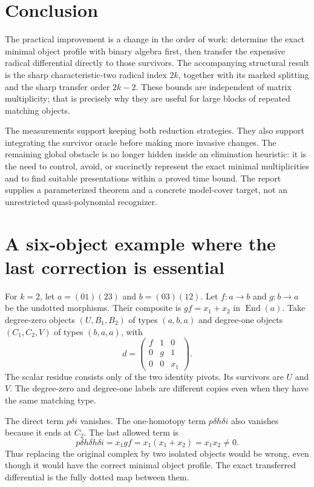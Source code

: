 \documentclass[11pt,letterpaper]{article}
\theoremstyle{definition}
\theoremstyle{remark}
\newcommand{\End}{\operatorname{End}}
\begin{document}
\section{Conclusion}
The practical improvement is a change in the order of work: determine the exact
minimal object profile with binary algebra first, then transfer the expensive
radical differential directly to those survivors. The accompanying structural
result is the sharp characteristic-two radical index $2k$, together with its
marked splitting and the sharp transfer order $2k-2$. These bounds are
independent of matrix multiplicity; that is precisely why they are useful for
large blocks of repeated matching objects.

The measurements support keeping both reduction strategies. They also support
integrating the survivor oracle before making more invasive changes. The
remaining global obstacle is no longer hidden inside an elimination heuristic:
it is the need to control, avoid, or succinctly represent the exact minimal
multiplicities and to find suitable presentations within a proved time bound.
The report supplies a parameterized theorem and a concrete model-cover target,
not an unrestricted quasi-polynomial recognizer.

\appendix
\section{A six-object example where the last correction is essential}
For $k=2$, let $a=(01)(23)$ and $b=(03)(12)$. Let
$f:a\to b$ and $g:b\to a$ be the undotted morphisms. Their composite is
$gf=x_1+x_2$ in $\End(a)$. Take degree-zero objects $(U,B_1,B_2)$ of types
$(a,b,a)$ and degree-one objects $(C_1,C_2,V)$ of types $(b,a,a)$, with
\[
 d=\begin{pmatrix}
 f&1&0\\
 0&g&1\\
 0&0&x_1
 \end{pmatrix}.
\]
The scalar residue consists only of the two identity pivots. Its survivors are
$U$ and $V$. The degree-zero and degree-one labels are different copies even
when they have the same matching type.

The direct term $p\delta i$ vanishes. The one-homotopy term
$p\delta h\delta i$ also vanishes because it ends at $C_2$. The last allowed
term is
\[
 p\delta h\delta h\delta i=x_1gf=x_1(x_1+x_2)=x_1x_2\ne0.
\]
Thus replacing the original complex by two isolated objects would be wrong,
even though it would have the correct minimal object profile. The exact
transferred differential is the fully dotted map between them.
\end{document}

